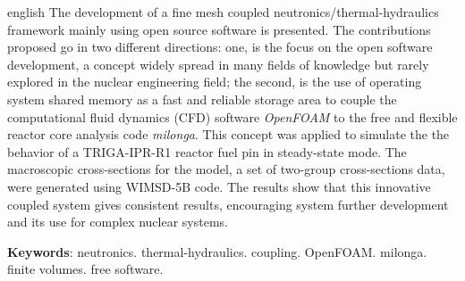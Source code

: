 \documentclass[12pt,openright,twoside,a4paper,english,french,spanish,brazil]{abntex2}
\begin{document}
\begin{resumo}[Abstract]
 \begin{otherlanguage*}{english}
   The development of a fine mesh coupled neutronics/thermal-hydraulics framework mainly using open source software is presented.
   The contributions proposed go in two different directions: one, is the focus on the open software development, a concept
   widely spread in many fields of knowledge but rarely explored in the nuclear engineering field; the second, is the use of operating
   system shared memory as a fast and reliable storage area to couple the computational fluid dynamics (CFD) software \textit{OpenFOAM} to the
   free and flexible reactor core analysis code \textit{milonga}. This concept was applied to simulate the the behavior of a TRIGA-IPR-R1 reactor
   fuel pin in steady-state mode. The macroscopic cross-sections for the model, a set of two-group cross-sections data, were generated using WIMSD-5B code.
   The results show that this innovative coupled system gives consistent results, encouraging system further development and its use for complex nuclear systems.
   
   \vspace{\onelineskip}
% 
   \noindent 
   \textbf{Keywords}: neutronics. thermal-hydraulics. coupling. OpenFOAM. milonga. finite volumes. free software.
 \end{otherlanguage*}
\end{resumo}

% 
% 

%  
% 
\end{document}
